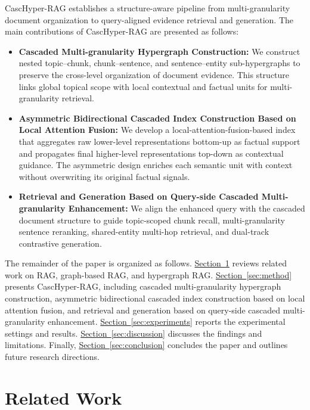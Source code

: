\documentclass[a4paper,fleqn]{cas-dc}
\begin{document}
CascHyper-RAG establishes a structure-aware pipeline from multi-granularity document organization to query-aligned evidence retrieval and generation. The main contributions of CascHyper-RAG are presented as follows:
{\setlength{\leftmargini}{1.6em}
\begin{itemize}
    \setlength{\itemsep}{4pt}
    \setlength{\parsep}{0pt}
    \setlength{\topsep}{2pt}
    \item \textbf{Cascaded Multi-granularity Hypergraph Construction:} We construct nested topic--chunk, chunk--sentence, and sentence--entity sub-hypergraphs to preserve the cross-level organization of document evidence. This structure links global topical scope with local contextual and factual units for multi-granularity retrieval.
    \item \textbf{Asymmetric Bidirectional Cascaded Index Construction Based on Local Attention Fusion:} We develop a local-attention-fusion-based index that aggregates raw lower-level representations bottom-up as factual support and propagates final higher-level representations top-down as contextual guidance. The asymmetric design enriches each semantic unit with context without overwriting its original factual signals.
    \item \textbf{Retrieval and Generation Based on Query-side Cascaded Multi-granularity Enhancement:} We align the enhanced query with the cascaded document structure to guide topic-scoped chunk recall, multi-granularity sentence reranking, shared-entity multi-hop retrieval, and dual-track contrastive generation.
\end{itemize}
}

The remainder of the paper is organized as follows. \hyperref[sec:related-work]{Section~\ref*{sec:related-work}} reviews related work on RAG, graph-based RAG, and hypergraph RAG. \hyperref[sec:method]{Section~\ref*{sec:method}} presents CascHyper-RAG, including cascaded multi-granularity hypergraph construction, asymmetric bidirectional cascaded index construction based on local attention fusion, and retrieval and generation based on query-side cascaded multi-granularity enhancement. \hyperref[sec:experiments]{Section~\ref*{sec:experiments}} reports the experimental settings and results. \hyperref[sec:discussion]{Section~\ref*{sec:discussion}} discusses the findings and limitations. Finally, \hyperref[sec:conclusion]{Section~\ref*{sec:conclusion}} concludes the paper and outlines future research directions.

\section{Related Work}\label{sec:related-work}
\end{document}
